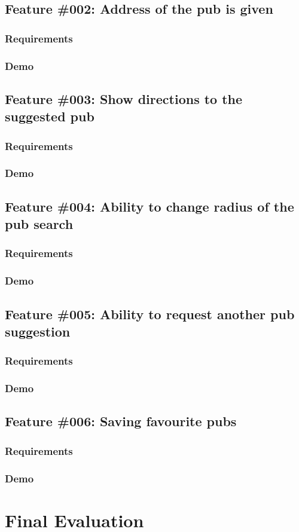 \documentclass{report}
\begin{document}
\section{Feature \#002: Address of the pub is given}
\subsection{Requirements}
\subsection{Demo}

\section{Feature \#003: Show directions to the suggested pub}
\subsection{Requirements}
\subsection{Demo}

\section{Feature \#004: Ability to change radius of the pub search}
\subsection{Requirements}
\subsection{Demo}

\section{Feature \#005: Ability to request another pub suggestion}
\subsection{Requirements}
\subsection{Demo}

\section{Feature \#006: Saving favourite pubs}
\subsection{Requirements}
\subsection{Demo}

\chapter{Final Evaluation}
\label{chapter:evaluation}
\end{document}
